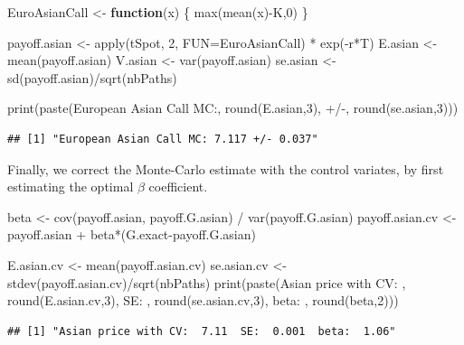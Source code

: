 \documentclass[12pt,]{tufte-book}
\newenvironment{Shaded}{}{}
\newcommand{\AttributeTok}[1]{\textcolor[rgb]{0.49,0.56,0.16}{#1}}
\newcommand{\ControlFlowTok}[1]{\textcolor[rgb]{0.00,0.44,0.13}{\textbf{#1}}}
\newcommand{\DecValTok}[1]{\textcolor[rgb]{0.25,0.63,0.44}{#1}}
\newcommand{\FunctionTok}[1]{\textcolor[rgb]{0.02,0.16,0.49}{#1}}
\newcommand{\NormalTok}[1]{#1}
\newcommand{\OtherTok}[1]{\textcolor[rgb]{0.00,0.44,0.13}{#1}}
\newcommand{\SpecialCharTok}[1]{\textcolor[rgb]{0.25,0.44,0.63}{#1}}
\newcommand{\StringTok}[1]{\textcolor[rgb]{0.25,0.44,0.63}{#1}}
\begin{document}
\begin{Shaded}
\begin{Highlighting}[]
\NormalTok{EuroAsianCall }\OtherTok{\textless{}{-}} \ControlFlowTok{function}\NormalTok{(x) \{}
  \FunctionTok{max}\NormalTok{(}\FunctionTok{mean}\NormalTok{(x)}\SpecialCharTok{{-}}\NormalTok{K,}\DecValTok{0}\NormalTok{)}
\NormalTok{\}}

\NormalTok{payoff.asian }\OtherTok{\textless{}{-}} \FunctionTok{apply}\NormalTok{(tSpot, }\DecValTok{2}\NormalTok{, }\AttributeTok{FUN=}\NormalTok{EuroAsianCall) }\SpecialCharTok{*} \FunctionTok{exp}\NormalTok{(}\SpecialCharTok{{-}}\NormalTok{r}\SpecialCharTok{*}\NormalTok{T)}
\NormalTok{E.asian }\OtherTok{\textless{}{-}} \FunctionTok{mean}\NormalTok{(payoff.asian)}
\NormalTok{V.asian }\OtherTok{\textless{}{-}} \FunctionTok{var}\NormalTok{(payoff.asian)}
\NormalTok{se.asian }\OtherTok{\textless{}{-}} \FunctionTok{sd}\NormalTok{(payoff.asian)}\SpecialCharTok{/}\FunctionTok{sqrt}\NormalTok{(nbPaths)}

\FunctionTok{print}\NormalTok{(}\FunctionTok{paste}\NormalTok{(}\StringTok{\textquotesingle{}European Asian Call MC:\textquotesingle{}}\NormalTok{, }\FunctionTok{round}\NormalTok{(E.asian,}\DecValTok{3}\NormalTok{),}
            \StringTok{\textquotesingle{}+/{-}\textquotesingle{}}\NormalTok{, }\FunctionTok{round}\NormalTok{(se.asian,}\DecValTok{3}\NormalTok{)))}
\end{Highlighting}
\end{Shaded}

\begin{verbatim}
## [1] "European Asian Call MC: 7.117 +/- 0.037"
\end{verbatim}

Finally, we correct the Monte-Carlo estimate with the control variates, by first estimating the optimal \(\beta\) coefficient.

\begin{Shaded}
\begin{Highlighting}[]
\NormalTok{beta }\OtherTok{\textless{}{-}} \FunctionTok{cov}\NormalTok{(payoff.asian, payoff.G.asian) }\SpecialCharTok{/} \FunctionTok{var}\NormalTok{(payoff.G.asian)}
\NormalTok{payoff.asian.cv }\OtherTok{\textless{}{-}}\NormalTok{ payoff.asian }\SpecialCharTok{+}\NormalTok{ beta}\SpecialCharTok{*}\NormalTok{(G.exact}\SpecialCharTok{{-}}\NormalTok{payoff.G.asian) }

\NormalTok{E.asian.cv }\OtherTok{\textless{}{-}} \FunctionTok{mean}\NormalTok{(payoff.asian.cv)}
\NormalTok{se.asian.cv }\OtherTok{\textless{}{-}} \FunctionTok{stdev}\NormalTok{(payoff.asian.cv)}\SpecialCharTok{/}\FunctionTok{sqrt}\NormalTok{(nbPaths)}
\FunctionTok{print}\NormalTok{(}\FunctionTok{paste}\NormalTok{(}\StringTok{\textquotesingle{}Asian price with CV: \textquotesingle{}}\NormalTok{ , }\FunctionTok{round}\NormalTok{(E.asian.cv,}\DecValTok{3}\NormalTok{), }
            \StringTok{\textquotesingle{} SE: \textquotesingle{}}\NormalTok{, }\FunctionTok{round}\NormalTok{(se.asian.cv,}\DecValTok{3}\NormalTok{),}
            \StringTok{\textquotesingle{} beta: \textquotesingle{}}\NormalTok{, }\FunctionTok{round}\NormalTok{(beta,}\DecValTok{2}\NormalTok{)))}
\end{Highlighting}
\end{Shaded}

\begin{verbatim}
## [1] "Asian price with CV:  7.11  SE:  0.001  beta:  1.06"
\end{verbatim}


\printindex
\end{document}
